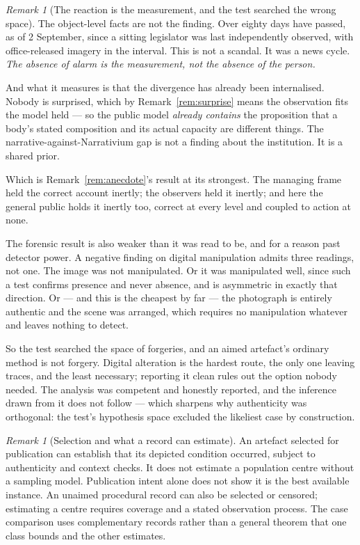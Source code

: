 \documentclass[11pt,a4paper]{article}
\theoremstyle{remark}
\newtheorem{remark}[definition]{Remark}
\begin{document}
\begin{remark}[The reaction is the measurement, and the test searched the wrong space]\label{rem:unseen}
The object-level facts are not the finding. Over eighty days have passed, as of 2 September, since a
sitting legislator was last independently observed, with office-released imagery in the interval. This is not a scandal. It was a news cycle. \emph{The
absence of alarm is the measurement, not the absence of the person.}

And what it measures is that the divergence has already been internalised. Nobody is surprised,
which by Remark~\ref{rem:surprise} means the observation fits the model held --- so the public model
\emph{already contains} the proposition that a body's stated composition and its actual capacity are
different things. The narrative-against-Narrativium gap is not a finding about the institution. It
is a shared prior.

Which is Remark~\ref{rem:anecdote}'s result at its strongest. The managing frame held the correct
account inertly; the observers held it inertly; and here the general public holds it inertly too,
correct at every level and coupled to action at none.

The forensic result is also weaker than it was read to be, and for a reason past detector power. A
negative finding on digital manipulation admits three readings, not one. The image was not manipulated.
Or it was manipulated well, since such a test confirms presence and never absence, and is
asymmetric in exactly that direction. Or --- and this is the cheapest by far --- the photograph is
entirely authentic and the scene was arranged, which requires no manipulation whatever and leaves
nothing to detect.

So the test searched the space of forgeries, and an aimed artefact's ordinary method is not
forgery. Digital alteration is the hardest route, the only one leaving traces, and the least necessary;
reporting it clean rules out the option nobody needed. The analysis was competent and honestly
reported, and the inference drawn from it does not follow --- which sharpens why authenticity was
orthogonal: the test's hypothesis space excluded the likeliest case by construction.
\end{remark}

\begin{remark}[Selection and what a record can estimate]\label{prop:aimed-unaimed}
An artefact selected for publication can establish that its depicted condition
occurred, subject to authenticity and context checks. It does not estimate a
population centre without a sampling model. Publication intent alone does not
show it is the best available instance. An unaimed procedural record can also
be selected or censored; estimating a centre requires coverage and a stated
observation process. The case comparison uses complementary records rather
than a general theorem that one class bounds and the other estimates.
\end{remark}
\end{document}
